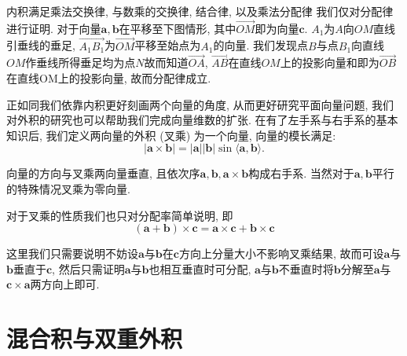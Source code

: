 \documentclass[./main.tex]{subfiles}
\begin{document}
内积满足乘法交换律, 与数乘的交换律, 结合律, 以及乘法分配律
我们仅对分配律进行证明. 对于向量\(\mathbf{a}, \mathbf{b}\)在平移至下图情形, 其中\(\overrightarrow{OM}\)即为向量\(\mathbf{c}\). \(A_1\)为\(A\)向\(OM\)直线引垂线的垂足, \(\overrightarrow{A_1B_1}\)为\(\overrightarrow{OM}\)平移至始点为\(A_1\)的向量. 我们发现点\(B\)与点\(B_1\)向直线\(OM\)作垂线所得垂足均为点\(N\)故而知道\(\overrightarrow{OA}\), \(\overrightarrow{AB}\)在直线\(OM\)上的投影向量和即为\(\overrightarrow{OB}\)在直线OM上的投影向量, 故而分配律成立. 
\begin{figure}[!ht]
    \centering
\end{figure}
正如同我们依靠内积更好刻画两个向量的角度, 从而更好研究平面向量问题, 我们对外积的研究也可以帮助我们完成向量维数的扩张. 在有了左手系与右手系的基本知识后, 我们定义两向量的外积 (叉乘) 为一个向量, 向量的模长满足: 
\[\left | \mathbf{a}\times \mathbf{b} \right | =\left | \mathbf{a} \right | \left | \mathbf{b} \right | \sin\langle\mathbf{a},\mathbf{b}\rangle.\]

向量的方向与叉乘两向量垂直, 且依次序\(\mathbf{a}, \mathbf{b}, \mathbf{a}\times \mathbf{b}\)构成右手系. 当然对于\(\mathbf{a}, \mathbf{b}\)平行的特殊情况叉乘为零向量. 

对于叉乘的性质我们也只对分配率简单说明, 即
\[(\mathbf{a}+\mathbf{b})\times\mathbf{c}=\mathbf{a}\times\mathbf{c}+\mathbf{b}\times\mathbf{c}\]

这里我们只需要说明不妨设\(\mathbf{a}\)与\(\mathbf{b}\)在\(\mathbf{c}\)方向上分量大小不影响叉乘结果, 故而可设\(\mathbf{a}\)与\(\mathbf{b}\)垂直于\(\mathbf{c}\), 然后只需证明\(\mathbf{a}\)与\(\mathbf{b}\)也相互垂直时可分配, \(\mathbf{a}\)与\(\mathbf{b}\)不垂直时将\(\mathbf{b}\)分解至\(\mathbf{a}\)与\(\mathbf{c}\times\mathbf{a}\)两方向上即可. 

\section{混合积与双重外积}
\end{document}
